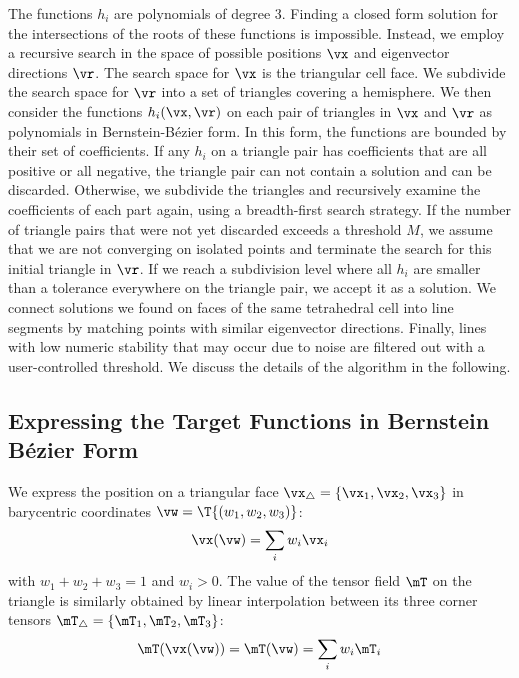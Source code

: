 %
The functions $h_i$ are polynomials of degree 3.
% 
Finding a closed form solution for the intersections of the roots of these
functions is impossible. 
% 
Instead, we employ a recursive search in the space of possible positions $\vx$
and eigenvector directions $\vr$.
% 
The search space for $\vx$ is the triangular cell face.
%
We subdivide the search space for $\vr$ into a set of triangles covering a
hemisphere.
% 
We then consider the functions $h_i(\vx, \vr)$ on each pair of triangles in
$\vx$ and $\vr$ as polynomials in Bernstein-B\'ezier form.
%
In this form, the functions are bounded by their set of coefficients.
%
If any $h_i$ on a triangle pair has coefficients that are all positive or all
negative, the triangle pair can not contain a solution and can be discarded.
%
Otherwise, we subdivide the triangles and recursively examine the coefficients
of each part again, using a breadth-first search strategy.
%
If the number of triangle pairs that were not yet discarded exceeds a threshold
$M$, we assume that we are not converging on isolated points and terminate the
search for this initial triangle in $\vr$.
% 
If we reach a subdivision level where all $h_i$ are smaller than a tolerance
everywhere on the triangle pair, we accept it as a solution.
%
We connect solutions we found on faces of the same tetrahedral cell into line
segments by matching points with similar eigenvector directions.
%
Finally, lines with low numeric stability that may occur due to noise are
filtered out with a user-controlled threshold.
%
We discuss the details of the algorithm in the following.
%

\subsection{Expressing the Target Functions in Bernstein B\'ezier Form} %
\label{sub:expressing_the_target_functions}
%
We express the position on a triangular face $\vx_\triangle = \{\vx_1, \vx_2,
\vx_3\}$ in barycentric coordinates $\vw = \T{(w_1, w_2, w_3)}$:
%
\begin{equation}
  \vx(\vw) = \sum_i w_i \vx_i
\end{equation}
%
with $w_1+w_2+w_3=1$ and $w_i > 0$.
%
The value of the tensor field $\mT$ on the triangle is similarly obtained
by linear interpolation between its three corner tensors $\mT_\triangle =
\{\mT_1, \mT_2, \mT_3\}$:
%
\begin{equation}
  \mT(\vx(\vw)) = \mT(\vw) = \sum_i w_i \mT_i
\end{equation}
%


